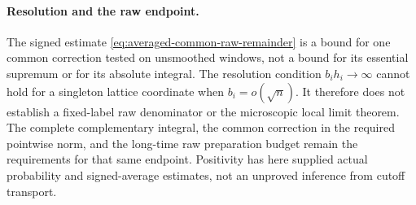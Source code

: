 \paragraph{Resolution and the raw endpoint.}
The signed estimate \eqref{eq:averaged-common-raw-remainder} is a bound
for one common correction tested on unsmoothed windows, not a bound
for its essential supremum or for its absolute integral. The resolution
condition $b_ih_i\to\infty$ cannot hold for a singleton lattice
coordinate when $b_i=o(\sqrt n)$. It therefore does not establish a
fixed-label raw denominator or the microscopic local limit theorem.
The complete complementary integral, the common correction in the
required pointwise norm, and the long-time raw preparation budget
remain the requirements for that same endpoint. Positivity has here
supplied actual probability and signed-average estimates, not an
unproved inference from cutoff transport.
